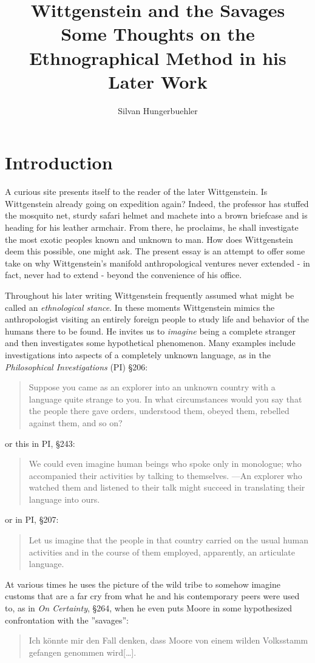 \documentclass{article}
\title{Wittgenstein and the Savages\\
\large Some Thoughts on the Ethnographical Method in his Later Work}
\date{}
\author{Silvan Hungerbuehler}
\begin{document}
\maketitle
\section{Introduction}
A curious site presents itself to the reader of the later Wittgenstein. Is Wittgenstein already going on expedition again? Indeed, the professor has stuffed the mosquito net, sturdy safari helmet and machete into a brown briefcase and is heading for his leather armchair. From there, he proclaims, he shall investigate the most exotic peoples known and unknown to man. How does Wittgenstein deem this possible, one might ask. The present essay is an attempt to offer some take on why Wittgenstein's manifold anthropological ventures never extended - in fact, never had to extend - beyond the convenience of his office. 

Throughout his later writing Wittgenstein frequently assumed what might be called an \textit{ethnological stance}. In these moments Wittgenstein mimics the anthropologist visiting an entirely foreign people to study life and behavior of the humans there to be found. He invites us to \textit{imagine} being a complete stranger and then investigates some hypothetical phenomenon. Many examples include investigations into aspects of a completely unknown language, as in the \textit{Philosophical Investigations} (PI) §206:
\begin{quote}
Suppose you came as an explorer into an unknown country with a
language quite strange to you. In what circumstances would you
say that the people there gave orders, understood them, obeyed them,
rebelled against them, and so on?
\end{quote}
or this in PI, §243:
\begin{quote}
We could even imagine human beings who spoke only in monologue; who accompanied their activities by talking to themselves. —An explorer who watched them and listened to their talk might succeed in translating their language into ours.
\end{quote}
or in PI, §207: 
\begin{quote}
Let us imagine that the people in that country carried on the usual human activities and in the course of them employed, apparently, an articulate language.\end{quote}
 At various times he uses the picture of the wild tribe to somehow imagine customs that are a far cry from what he and his contemporary peers were used to, as in \textit{On Certainty}, §264, when he even puts Moore in some hypothesized confrontation with the ''savages'':
 \begin{quote}
Ich könnte mir den Fall denken, dass Moore von einem wilden Volksstamm gefangen genommen wird[…].
\end{quote}
\end{document}
